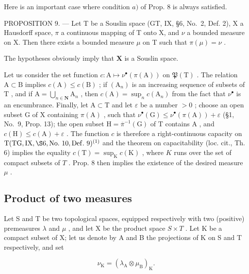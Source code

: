 Here is an important case where condition \(a)\) of Prop. 8 is always satisfied.

PROPOSITION 9. --- Let T be a Souslin space (GT, IX, §6, No.~2, Def. 2), X a Hausdorff space, \(\pi\) a continuous mapping of T onto X, and \(\nu\) a bounded measure on X. Then there exists a bounded measure \(\mu\) on T such that \(\pi(\mu) = \nu\) .

The hypotheses obviously imply that \(\mathbf{X}\) is a Souslin space.

Let us consider the set function \(c: \mathrm{A} \mapsto \nu^{\bullet}(\pi(\mathrm{A}))\) on \(\mathfrak{P}(\mathrm{T})\) . The relation \(\mathrm{A} \subset \mathrm{B}\) implies \(c(\mathrm{A}) \leqslant c(\mathrm{B})\) ; if \((\mathrm{A}_n)\) is an increasing sequence of subsets of \(\mathrm{T}\) , and if \(\mathrm{A} = \bigcup_{n \in \mathbf{N}} \mathrm{A}_n\) , then \(c(\mathrm{A}) = \sup_n c(\mathrm{A}_n)\) from the fact that \(\nu^{\bullet}\) is an encumbrance. Finally, let \(\mathrm{A} \subset \mathrm{T}\) and let \(\varepsilon\) be a number \(> 0\) ; choose an open subset \(\mathrm{G}\) of \(\mathrm{X}\) containing \(\pi(\mathrm{A})\) , such that \(\nu^{\bullet}(\mathrm{G}) \leqslant \nu^{\bullet}(\pi(\mathrm{A})) + \varepsilon\) (§1, No.~9, Prop. 13); the open subset \(\mathrm{H} = \overline{\pi}^{-1}(\mathrm{G})\) of \(\mathrm{T}\) contains \(\mathrm{A}\) , and \(c(\mathrm{H}) \leqslant c(\mathrm{A}) + \varepsilon\) . The function \(c\) is therefore a right-continuous capacity on \(\mathrm{T} (\mathrm{TG},\mathrm{IX},\S 6,\mathrm{No.~10},\mathrm{Def.~9})^{(1)}\) and the theorem on capacitability (loc. cit., Th. 6) implies the equality \(c(\mathrm{T}) = \sup_{\mathrm{K}}c(\mathrm{K})\) , where \(K\) runs over the set of compact subsets of \(T\) . Prop. 8 then implies the existence of the desired measure \(\mu\) .

\subsection{Product of two measures}

Let S and T be two topological spaces, equipped respectively with two (positive) premeasures \(\lambda\) and \(\mu\) , and let X be the product space \(S \times T\) . Let K be a compact subset of X; let us denote by A and B the projections of K on S and T respectively, and set

\[
\nu_ {\mathrm{K}} = \left(\lambda_ {\mathrm{A}} \otimes \mu_ {\mathrm{B}}\right) _ {\mathrm{K}}.\tag{3}
\]

